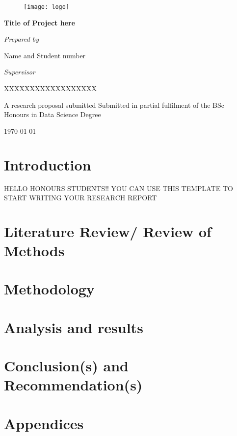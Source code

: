 \documentclass[12pt,a4paper]{article}
\begin{document}


\begin{figure}
	\centering
	\texttt{[image: logo]}

	\label{fig:logo1}
\end{figure}


\begin{center}
	\begin{spacing}{1.5}
	{\Huge{\bf Title of Project here}}\medskip
	
	\noindent \textbf{}
	
	
	
	\noindent \textit{Prepared by}\vskip 1cm
	\noindent \textbf{}
	
	\noindent Name and Student number \vskip 1cm
	
	\noindent \textit{Supervisor}\vskip 1cm
	
	\noindent XXXXXXXXXXXXXXXXXX\vskip 1cm
	\noindent 
	
	\noindent A research proposal submitted Submitted in partial fulfilment of the BSc Honours in Data Science Degree\medskip
	
	\noindent \today
		\end{spacing}
	\end{center}

\noindent 
\newpage
\tableofcontents

\noindent \textbf{\eject }

\noindent 
\section{Introduction}
HELLO HONOURS STUDENTS!! YOU CAN USE THIS TEMPLATE TO START WRITING YOUR RESEARCH REPORT
\section{Literature Review/ Review of Methods}
\section{Methodology}
\section{Analysis and results}
\section{Conclusion(s) and Recommendation(s)}

\section{Appendices}



\end{document}
